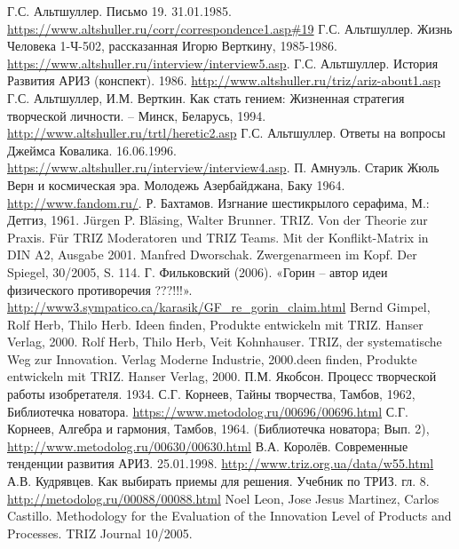 \begin{thebibliography}{xxx}
 Г.С. Альтшуллер. Письмо 19.  31.01.1985.
  \url{https://www.altshuller.ru/corr/correspondence1.asp#19}
 Г.С. Альтшуллер. Жизнь Человека 1-Ч-502, рассказанная
  Игорю Верткину, 1985-1986.
  \url{https://www.altshuller.ru/interview/interview5.asp}.
 Г.С. Альтшуллер.  История Развития АРИЗ (конспект).
  1986.  \url{http://www.altshuller.ru/triz/ariz-about1.asp}
 Г.С. Альтшуллер, И.М. Верткин. Как стать гением:
  Жизненная стратегия творческой личности. -- Минск, Беларусь, 1994.
  \url{http://www.altshuller.ru/trtl/heretic2.asp}
 Г.С. Альтшуллер. Ответы на вопросы Джеймса Ковалика.
  16.06.1996.  \url{https://www.altshuller.ru/interview/interview4.asp}.
 П. Амнуэль. Старик Жюль Верн и космическая эра. Молодежь
  Азербайджана, Баку 1964.  \url{http://www.fandom.ru/}.
 Р. Бахтамов. Изгнание шестикрылого серафима, М.:
  Детгиз, 1961.  
 Jürgen P. Bläsing, Walter Brunner. TRIZ. Von der
  Theorie zur Praxis. Für TRIZ Moderatoren und TRIZ Teams. Mit der
  Konflikt-Matrix in DIN A2, Ausgabe 2001.
 Manfred Dworschak. Zwergenarmeen im Kopf. Der
  Spiegel, 30/2005, S. 114.
 Г. Фильковский (2006). «Горин -- автор идеи
  физического противоречия ???!!!».
  \url{http://www3.sympatico.ca/karasik/GF_re_gorin_claim.html}
 Bernd Gimpel, Rolf Herb, Thilo Herb. Ideen finden,
  Produkte entwickeln mit TRIZ. Hanser Verlag, 2000.
 Rolf Herb, Thilo Herb, Veit Kohnhauser. TRIZ, der
  systematische Weg zur Innovation. Verlag Moderne Industrie, 2000.deen finden,
  Produkte entwickeln mit TRIZ. Hanser Verlag, 2000.
  П.М. Якобсон. Процесс творческой работы изобретателя.
  1934. 
 С.Г. Корнеев, Тайны творчества, Тамбов, 1962,
  Библиотечка новатора.  \url{https://www.metodolog.ru/00696/00696.html} 
 С.Г. Корнеев, Алгебра и гармония, Тамбов, 1964.
  (Библиотечка новатора; Вып. 2),
  \url{http://www.metodolog.ru/00630/00630.html}
 В.А. Королёв. Современные тенденции развития АРИЗ.
  25.01.1998. \url{http://www.triz.org.ua/data/w55.html}
 А.В. Кудрявцев. Как выбирать приемы для решения.
  Учебник по ТРИЗ. гл. 8.  \url{http://metodolog.ru/00088/00088.html}
 Noel Leon, Jose Jesus Martinez, Carlos Castillo.
  Methodology for the Evaluation of the Innovation Level of Products and
  Processes. TRIZ Journal 10/2005.

\end{thebibliography}
